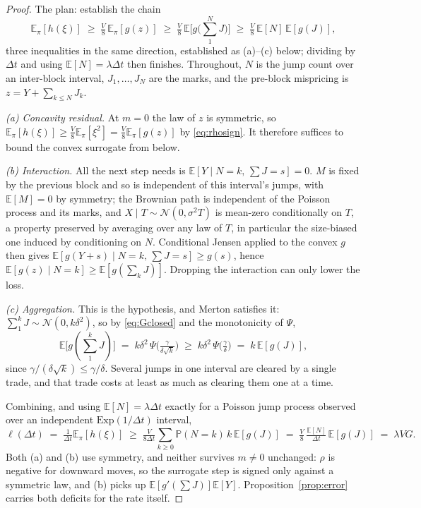 \documentclass[runningheads]{llncs}
\newcommand{\E}{\mathbb{E}}
\newcommand{\Prob}{\mathbb{P}}
\newcommand{\dt}{\Delta t}
\newcommand{\1}{\mathbf{1}}
\begin{document}
\begin{proof}
The plan: establish the chain
\[
\E_\pi[h(\xi)] \;\ge\; \tfrac{V}{8}\,\E_\pi[g(z)] \;\ge\; \tfrac{V}{8}\,\E\big[g\big(\textstyle\sum_1^N J\big)\big] \;\ge\; \tfrac{V}{8}\,\E[N]\,\E[g(J)],
\]
three inequalities in the same direction, established as (a)--(c) below; dividing by $\dt$ and using $\E[N]=\lambda\dt$ then finishes. Throughout, $N$ is the jump count over an inter-block interval, $J_1,\dots,J_N$ are the marks, and the pre-block mispricing is $z = Y + \sum_{k\le N}J_k$.

\emph{(a) Concavity residual.} At $m=0$ the law of $z$ is symmetric, so $\E_\pi[h(\xi)] \ge \tfrac{V}{8}\E_\pi[\xi^2] = \tfrac{V}{8}\E_\pi[g(z)]$ by \eqref{eq:rhosign}. It therefore suffices to bound the convex surrogate from below.

\emph{(b) Interaction.} All the next step needs is $\E[Y\mid N{=}k,\,\sum J = s]=0$. $M$ is fixed by the previous block and so is independent of this interval's jumps, with $\E[M]=0$ by symmetry; the Brownian path is independent of the Poisson process and its marks, and $X\mid T\sim\mathcal N(0,\sigma^2T)$ is mean-zero conditionally on $T$, a property preserved by averaging over any law of $T$, in particular the size-biased one induced by conditioning on $N$. Conditional Jensen applied to the convex $g$ then gives $\E[g(Y+s)\mid N{=}k,\,\sum J = s] \ge g(s)$, hence $\E[g(z)\mid N{=}k] \ge \E[g(\sum_{k}J)]$. Dropping the interaction can only lower the loss.

\emph{(c) Aggregation.} This is the hypothesis, and Merton satisfies it: $\sum_{1}^{k}J \sim \mathcal N(0,k\delta^2)$, so by \eqref{eq:Gclosed} and the monotonicity of $\Psi$,
\[
\E\big[g(\textstyle\sum_1^k J)\big] \;=\; k\delta^2\,\Psi\!\big(\tfrac{\gamma}{\delta\sqrt k}\big) \;\ge\; k\delta^2\,\Psi\!\big(\tfrac{\gamma}{\delta}\big) \;=\; k\,\E[g(J)],
\]
since $\gamma/(\delta\sqrt k)\le\gamma/\delta$. Several jumps in one interval are cleared by a single trade, and that trade costs at least as much as clearing them one at a time.

Combining, and using $\E[N]=\lambda\dt$ exactly for a Poisson jump process observed over an independent $\mathrm{Exp}(1/\dt)$ interval,
\[
\ell(\dt) \;=\; \tfrac{1}{\dt}\E_\pi[h(\xi)] \;\ge\; \tfrac{V}{8\dt}\sum_{k\ge0}\Prob(N{=}k)\,k\,\E[g(J)] \;=\; \tfrac{V}{8}\,\tfrac{\E[N]}{\dt}\,\E[g(J)] \;=\; \lambda V G .
\]
Both (a) and (b) use symmetry, and neither survives $m\neq0$ unchanged: $\rho$ is negative for downward moves, so the surrogate step is signed only against a symmetric law, and (b) picks up $\E[g'(\sum J)]\E[Y]$. Proposition~\ref{prop:error} carries both deficits for the rate itself.
\end{proof}
\end{document}
